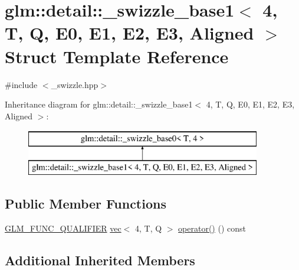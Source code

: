 \hypertarget{structglm_1_1detail_1_1__swizzle__base1_3_014_00_01_t_00_01_q_00_01_e0_00_01_e1_00_01_e2_00_01_e3_00_01_aligned_01_4}{}\section{glm\+:\+:detail\+:\+:\+\_\+swizzle\+\_\+base1$<$ 4, T, Q, E0, E1, E2, E3, Aligned $>$ Struct Template Reference}
\label{structglm_1_1detail_1_1__swizzle__base1_3_014_00_01_t_00_01_q_00_01_e0_00_01_e1_00_01_e2_00_01_e3_00_01_aligned_01_4}


{\ttfamily \#include $<$\+\_\+swizzle.\+hpp$>$}

Inheritance diagram for glm\+:\+:detail\+:\+:\+\_\+swizzle\+\_\+base1$<$ 4, T, Q, E0, E1, E2, E3, Aligned $>$\+:\begin{figure}[H]
\begin{center}
\leavevmode
\includegraphics[height=2.000000cm]{structglm_1_1detail_1_1__swizzle__base1_3_014_00_01_t_00_01_q_00_01_e0_00_01_e1_00_01_e2_00_01_e3_00_01_aligned_01_4}
\end{center}
\end{figure}
\subsection*{Public Member Functions}
\begin{DoxyCompactItemize}
\item 
\hyperlink{setup_8hpp_a33fdea6f91c5f834105f7415e2a64407}{G\+L\+M\+\_\+\+F\+U\+N\+C\+\_\+\+Q\+U\+A\+L\+I\+F\+I\+ER} \hyperlink{structglm_1_1vec}{vec}$<$ 4, T, Q $>$ \hyperlink{structglm_1_1detail_1_1__swizzle__base1_3_014_00_01_t_00_01_q_00_01_e0_00_01_e1_00_01_e2_00_01_e3_00_01_aligned_01_4_a4f7066f4879ee4e9a999748d556c9198}{operator()} () const
\end{DoxyCompactItemize}
\subsection*{Additional Inherited Members}


